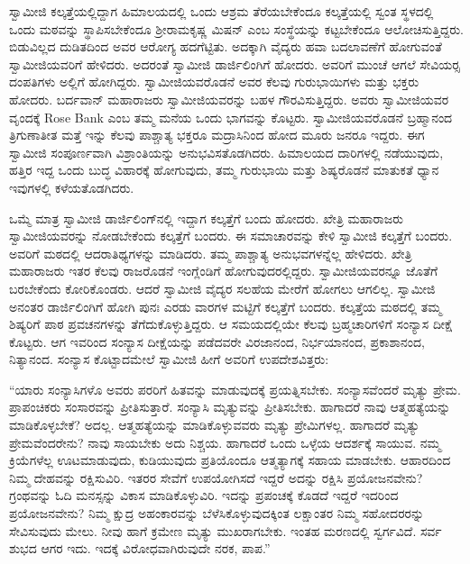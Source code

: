  ಸ್ವಾಮೀಜಿ ಕಲ್ಕತ್ತೆಯಲ್ಲಿದ್ದಾಗ ಹಿಮಾಲಯದಲ್ಲಿ ಒಂದು ಆಶ್ರಮ ತೆರೆಯಬೇಕೆಂದೂ ಕಲ್ಕತ್ತೆಯಲ್ಲಿ ಸ್ವಂತ ಸ್ಥಳದಲ್ಲಿ ಒಂದು ಮಠವನ್ನು ಸ್ಥಾಪಿಸಬೇಕೆಂದೂ ಶ‍್ರೀರಾಮಕೃಷ್ಣ ಮಿಷನ್ ಎಂಬ ಸಂಸ್ಥೆಯನ್ನು ಕಟ್ಟಬೇಕೆಂದೂ ಆಲೋಚಿಸುತ್ತಿದ್ದರು. ಬಿಡುವಿಲ್ಲದ ದುಡಿತದಿಂದ ಅವರ ಆರೋಗ್ಯ ಹದಗೆಟ್ಟಿತು. ಅದಕ್ಕಾಗಿ ವೈದ್ಯರು ಹವಾ ಬದಲಾವಣೆಗೆ ಹೋಗುವಂತೆ ಸ್ವಾಮೀಜಿಯವರಿಗೆ ಹೇಳಿದರು. ಅದರಂತೆ ಸ್ವಾಮೀಜಿ ಡಾರ್ಜಿಲಿಂಗಿಗೆ ಹೋದರು. ಅವರಿಗೆ ಮುಂಚೆ ಆಗಲೆ ಸೇವಿಯರ‍್ಸ ದಂಪತಿಗಳು ಅಲ್ಲಿಗೆ ಹೋಗಿದ್ದರು. ಸ್ವಾಮೀಜಿಯವರೊಡನೆ ಅವರ ಕೆಲವು ಗುರುಭಾಯಿಗಳು ಮತ್ತು ಭಕ್ತರು ಹೋದರು. ಬರ್ದವಾನ್ ಮಹಾರಾಜರು ಸ್ವಾಮೀಜಿಯವರನ್ನು ಬಹಳ ಗೌರವಿಸುತ್ತಿದ್ದರು. ಅವರು ಸ್ವಾಮೀಜಿಯವರ ವೃಂದಕ್ಕೆ Rose Bank ಎಂಬ ತಮ್ಮ ಮನೆಯ ಒಂದು ಭಾಗವನ್ನು ಕೊಟ್ಟರು. ಸ್ವಾಮೀಜಿಯವರೊಡನೆ ಬ್ರಹ್ಮಾನಂದ ತ್ರಿಗುಣಾತೀತ ಮತ್ತೆ ಇನ್ನು ಕೆಲವು ಪಾಶ್ಚಾತ್ಯ ಭಕ್ತರೂ ಮದ್ರಾಸಿನಿಂದ ಹೋದ ಮೂರು ಜನರೂ ಇದ್ದರು. ಈಗ ಸ್ವಾಮೀಜಿ ಸಂಪೂರ್ಣವಾಗಿ ವಿಶ್ರಾಂತಿಯನ್ನು ಅನುಭವಿಸತೊಡಗಿದರು. ಹಿಮಾಲಯದ ದಾರಿಗಳಲ್ಲಿ ನಡೆಯುವುದು, ಹತ್ತಿರ ಇದ್ದ ಒಂದು ಬುದ್ಧ ವಿಹಾರಕ್ಕೆ ಹೋಗುವುದು, ತಮ್ಮ ಗುರುಭಾಯಿ ಮತ್ತು ಶಿಷ್ಯರೊಡನೆ ಮಾತುಕತೆ ಧ್ಯಾನ ಇವುಗಳಲ್ಲಿ ಕಳೆಯತೊಡಗಿದರು. 

 ಒಮ್ಮೆ ಮಾತ್ರ ಸ್ವಾಮೀಜಿ ಡಾರ್ಜಿಲಿಂಗ್‍ನಲ್ಲಿ ಇದ್ದಾಗ ಕಲ್ಕತ್ತೆಗೆ ಬಂದು ಹೋದರು. ಖೇತ್ರಿ ಮಹಾರಾಜರು ಸ್ವಾಮೀಜಿಯವರನ್ನು ನೋಡಬೇಕೆಂದು ಕಲ್ಕತ್ತೆಗೆ ಬಂದರು. ಈ ಸಮಾಚಾರವನ್ನು ಕೇಳಿ ಸ್ವಾಮೀಜಿ ಕಲ್ಕತ್ತೆಗೆ ಬಂದರು. ಅವರಿಗೆ ಮಠದಲ್ಲಿ ಆದರಾತಿಥ್ಯಗಳನ್ನು ಮಾಡಿದರು. ತಮ್ಮ ಪಾಶ್ಚಾತ್ಯ ಅನುಭವಗಳನ್ನೆಲ್ಲ ಹೇಳಿದರು. ಖೇತ್ರಿ ಮಹಾರಾಜರು ಇತರ ಕೆಲವು ರಾಜರೊಡನೆ ಇಂಗ್ಲೆಂಡಿಗೆ ಹೋಗುವುದರಲ್ಲಿದ್ದರು. ಸ್ವಾಮೀಜಿಯವರನ್ನೂ ಜೊತೆಗೆ ಬರಬೇಕೆಂದು ಕೋರಿಕೊಂಡರು. ಆದರೆ ಸ್ವಾಮೀಜಿ ವೈದ್ಯರ ಸಲಹೆಯ ಮೇರೆಗೆ ಹೋಗಲು ಆಗಲಿಲ್ಲ. ಸ್ವಾಮೀಜಿ ಅನಂತರ ಡಾರ್ಜಿಲಿಂಗಿಗೆ ಹೋಗಿ ಪುನಃ ಎರಡು ವಾರಗಳ ಮಟ್ಟಿಗೆ ಕಲ್ಕತ್ತೆಗೆ ಬಂದರು. ಕಲ್ಕತ್ತೆಯ ಮಠದಲ್ಲಿ ತಮ್ಮ ಶಿಷ್ಯರಿಗೆ ಪಾಠ ಪ್ರವಚನಗಳನ್ನು ತೆಗೆದುಕೊಳ್ಳುತ್ತಿದ್ದರು. ಆ ಸಮಯದಲ್ಲಿಯೇ ಕೆಲವು ಬ್ರಹ್ಮಚಾರಿಗಳಿಗೆ ಸಂನ್ಯಾಸ ದೀಕ್ಷೆ ಕೊಟ್ಟರು. ಆಗ ಇವರಿಂದ ಸಂನ್ಯಾಸ ದೀಕ್ಷೆಯನ್ನು ಪಡೆದವರೇ ವಿರಜಾನಂದ, ನಿರ್ಭಯಾನಂದ, ಪ್ರಕಾಶಾನಂದ, ನಿತ್ಯಾನಂದ. ಸಂನ್ಯಾಸ ಕೊಟ್ಟಾದಮೇಲೆ ಸ್ವಾಮೀಜಿ ಹೀಗೆ ಅವರಿಗೆ ಉಪದೇಶವಿತ್ತರು: 

 “ಯಾರು ಸಂನ್ಯಾಸಿಗಳೊ ಅವರು ಪರರಿಗೆ ಹಿತವನ್ನು ಮಾಡುವುದಕ್ಕೆ ಪ್ರಯತ್ನಿಸಬೇಕು. ಸಂನ್ಯಾಸವೆಂದರೆ ಮೃತ್ಯು ಪ್ರೇಮ. ಪ್ರಾಪಂಚಿಕರು ಸಂಸಾರವನ್ನು ಪ್ರೀತಿಸುತ್ತಾರೆ. ಸಂನ್ಯಾಸಿ ಮೃತ್ಯುವನ್ನು ಪ್ರೀತಿಸಬೇಕು. ಹಾಗಾದರೆ ನಾವು ಆತ್ಮಹತ್ಯೆಯನ್ನು ಮಾಡಿಕೊಳ್ಳಬೇಕೆ? ಅದಲ್ಲ. ಆತ್ಮಹತ್ಯೆಯನ್ನು ಮಾಡಿಕೊಳ್ಳುವವರು ಮೃತ್ಯು ಪ್ರೇಮಿಗಳಲ್ಲ. ಹಾಗಾದರೆ ಮೃತ್ಯು ಪ್ರೇಮವೆಂದರೇನು? ನಾವು ಸಾಯಬೇಕು ಅದು ನಿಶ್ಚಯ. ಹಾಗಾದರೆ ಒಂದು ಒಳ್ಳೆಯ ಆದರ್ಶಕ್ಕೆ ಸಾಯುವ. ನಮ್ಮ ಕ್ರಿಯೆಗಳೆಲ್ಲ ಊಟಮಾಡುವುದು, ಕುಡಿಯುವುದು ಪ್ರತಿಯೊಂದೂ ಆತ್ಮತ್ಯಾಗಕ್ಕೆ ಸಹಾಯ ಮಾಡಬೇಕು. ಆಹಾರದಿಂದ ನಿಮ್ಮ ದೇಹವನ್ನು ರಕ್ಷಿಸುವಿರಿ. ಇತರರ ಸೇವೆಗೆ ಉಪಯೋಗಿಸದೆ ಇದ್ದರೆ ಅದನ್ನು ರಕ್ಷಿಸಿ ಪ್ರಯೋಜನವೇನು? ಗ್ರಂಥವನ್ನು ಓದಿ ಮನಸ್ಸನ್ನು ವಿಕಾಸ ಮಾಡಿಕೊಳ್ಳುವಿರಿ. ಇದನ್ನು ಪ್ರಪಂಚಕ್ಕೆ ಕೊಡದೆ ಇದ್ದರೆ ಇದರಿಂದ ಪ್ರಯೋಜನವೇನು? ನಿಮ್ಮ ಕ್ಷುದ್ರ ಅಹಂಕಾರವನ್ನು ಬೆಳೆಸಿಕೊಳ್ಳುವುದಕ್ಕಿಂತ ಲಕ್ಷಾಂತರ ನಿಮ್ಮ ಸಹೋದರರನ್ನು ಸೇವಿಸುವುದು ಮೇಲು. ನೀವು ಹಾಗೆ ಕ್ರಮೇಣ ಮೃತ್ಯು ಮುಖರಾಗಬೇಕು. ಇಂತಹ ಮರಣದಲ್ಲಿ ಸ್ವರ್ಗವಿದೆ. ಸರ್ವ ಶುಭದ ಆಗರ ಇದು. ಇದಕ್ಕೆ ವಿರೋಧವಾಗಿರುವುದೇ ನರಕ, ಪಾಪ.” 

